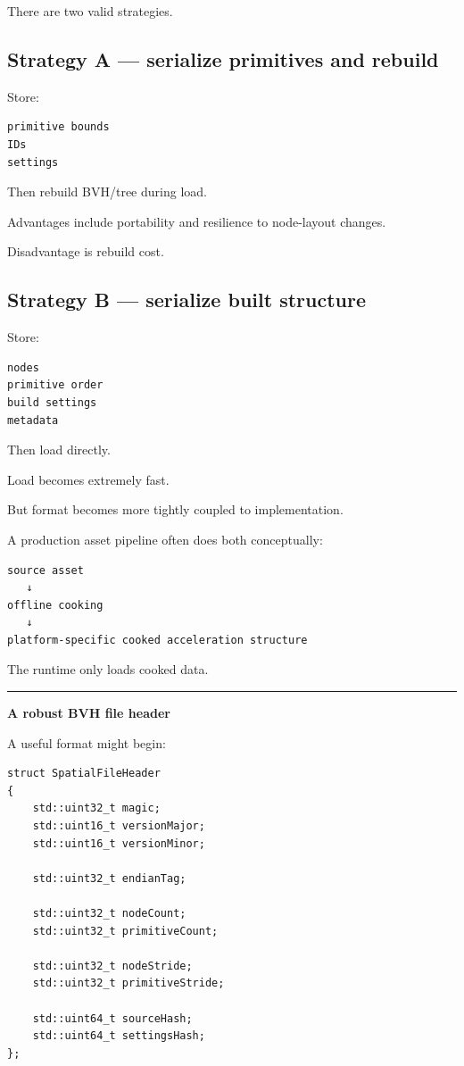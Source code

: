 There are two valid strategies.

\subsection{Strategy A --- serialize primitives and rebuild}\label{06-engine-ii-ch031-strategy-a-serialize-primitives-and-rebuild}

Store:

\begin{verbatim}
primitive bounds
IDs
settings
\end{verbatim}

Then rebuild BVH/tree during load.

Advantages include portability and resilience to node-layout changes.

Disadvantage is rebuild cost.

\subsection{Strategy B --- serialize built structure}\label{06-engine-ii-ch031-strategy-b-serialize-built-structure}

Store:

\begin{verbatim}
nodes
primitive order
build settings
metadata
\end{verbatim}

Then load directly.

Load becomes extremely fast.

But format becomes more tightly coupled to implementation.

A production asset pipeline often does both conceptually:

\begin{verbatim}
source asset
   ↓
offline cooking
   ↓
platform-specific cooked acceleration structure
\end{verbatim}

The runtime only loads cooked data.

\begin{center}\rule{0.5\linewidth}{0.5pt}\end{center}

\textbf{A robust BVH file header}

A useful format might begin:

\begin{verbatim}
struct SpatialFileHeader
{
    std::uint32_t magic;
    std::uint16_t versionMajor;
    std::uint16_t versionMinor;

    std::uint32_t endianTag;

    std::uint32_t nodeCount;
    std::uint32_t primitiveCount;

    std::uint32_t nodeStride;
    std::uint32_t primitiveStride;

    std::uint64_t sourceHash;
    std::uint64_t settingsHash;
};
\end{verbatim}


